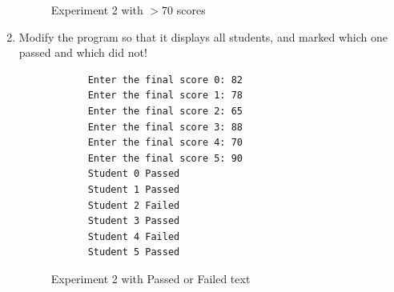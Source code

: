 \documentclass[12pt,titlepage]{article}
\begin{document}
\begin{enumerate}
{        \begin{figure}[h]
            \centering
            \caption{Experiment 2 with $>$70 scores}
        \end{figure}
    }
    \item {
        Modify the program so that it displays all students, and marked which one passed and which did not!

        \begin{verbatim}
            Enter the final score 0: 82
            Enter the final score 1: 78
            Enter the final score 2: 65
            Enter the final score 3: 88
            Enter the final score 4: 70
            Enter the final score 5: 90
            Student 0 Passed
            Student 1 Passed
            Student 2 Failed
            Student 3 Passed
            Student 4 Failed
            Student 5 Passed
        \end{verbatim}

        \begin{figure}[h]
            \centering
            \caption{Experiment 2 with Passed or Failed text}
        \end{figure}
    }
\end{enumerate}
\end{document}
